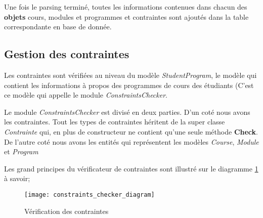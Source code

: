 

Une fois le parsing terminé, toutes les informations contenues dans chacun des \textbf{objets} cours, modules et programmes et contraintes sont ajoutés dans la table correspondante en base de donnée. 


\subsection{Gestion des contraintes}
\label{constraint_mgmt}
Les contraintes sont vérifiées au niveau du modèle \textit{StudentProgram}, le modèle qui contient les informations à propos des programmes de cours des étudiants (C'est ce modèle qui appelle le module \textit{ConstraintsChecker}. 

Le module \textit{ConstraintsChecker} est divisé en deux parties. D'un coté nous avons les contraintes. Tout les types de contraintes héritent de la super classe \textit{Contrainte} qui, en plus de constructeur ne contient qu'une seule méthode \textbf{Check}. De l'autre coté nous avons les entités qui représentent les modèles \textit{Course}, \textit{Module} et \textit{Program}

Les grand principes du vérificateur de contraintes sont illustré sur le diagramme \ref{fig:constraint_checker_diagram} à savoir;

\begin{figure}
\centering
\caption{Vérification des contraintes}
\label{fig:constraint_checker_diagram}
\texttt{[image: constraints\_checker\_diagram]}
\end{figure}

